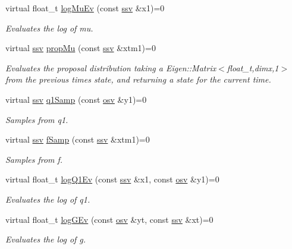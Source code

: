 \begin{DoxyCompactItemize}
virtual float\+\_\+t \hyperlink{classAPF_a7f595770b8f17cbad8e00b98e1b3bd04}{log\+Mu\+Ev} (const \hyperlink{classAPF_a5f96da87f00ff75af1232f9021daf06a}{ssv} \&x1)=0
\begin{DoxyCompactList}\small\item\em Evaluates the log of mu. \end{DoxyCompactList}\item 
virtual \hyperlink{classAPF_a5f96da87f00ff75af1232f9021daf06a}{ssv} \hyperlink{classAPF_ab57f2f5fb1af1ef6f82fbe1ca3d20905}{prop\+Mu} (const \hyperlink{classAPF_a5f96da87f00ff75af1232f9021daf06a}{ssv} \&xtm1)=0
\begin{DoxyCompactList}\small\item\em Evaluates the proposal distribution taking a Eigen\+::\+Matrix$<$float\+\_\+t,dimx,1$>$ from the previous time\textquotesingle{}s state, and returning a state for the current time. \end{DoxyCompactList}\item 
virtual \hyperlink{classAPF_a5f96da87f00ff75af1232f9021daf06a}{ssv} \hyperlink{classAPF_ad4eaf5c7d00ef9c8b8529e08bda21f13}{q1\+Samp} (const \hyperlink{classAPF_aa8ac25c475e54ddf21999f28727a049e}{osv} \&y1)=0
\begin{DoxyCompactList}\small\item\em Samples from q1. \end{DoxyCompactList}\item 
virtual \hyperlink{classAPF_a5f96da87f00ff75af1232f9021daf06a}{ssv} \hyperlink{classAPF_a30fc3aa6c6217bd4a40f07ee5a9d60d2}{f\+Samp} (const \hyperlink{classAPF_a5f96da87f00ff75af1232f9021daf06a}{ssv} \&xtm1)=0
\begin{DoxyCompactList}\small\item\em Samples from f. \end{DoxyCompactList}\item 
virtual float\+\_\+t \hyperlink{classAPF_aa892fcb9a774cd2158d107cb64f4db49}{log\+Q1\+Ev} (const \hyperlink{classAPF_a5f96da87f00ff75af1232f9021daf06a}{ssv} \&x1, const \hyperlink{classAPF_aa8ac25c475e54ddf21999f28727a049e}{osv} \&y1)=0
\begin{DoxyCompactList}\small\item\em Evaluates the log of q1. \end{DoxyCompactList}\item 
virtual float\+\_\+t \hyperlink{classAPF_ab81a714dacc1ee5ea1aa66ffee46f832}{log\+G\+Ev} (const \hyperlink{classAPF_aa8ac25c475e54ddf21999f28727a049e}{osv} \&yt, const \hyperlink{classAPF_a5f96da87f00ff75af1232f9021daf06a}{ssv} \&xt)=0
\begin{DoxyCompactList}\small\item\em Evaluates the log of g. \end{DoxyCompactList}\end{DoxyCompactItemize}
